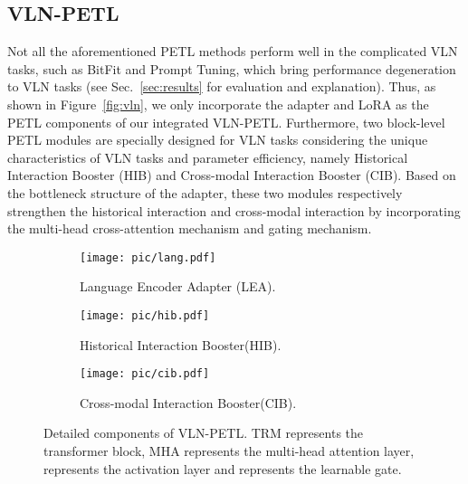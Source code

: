 \documentclass[10pt,twocolumn,letterpaper]{article}
\begin{document}
\vspace{-5pt}
\subsection{VLN-PETL}
\vspace{-3pt}
Not all the aforementioned PETL methods perform well in the complicated VLN tasks, such as BitFit and Prompt Tuning, which bring performance degeneration to VLN tasks (see Sec.~\ref{sec:results} for evaluation and explanation).  Thus, as shown in Figure~\ref{fig:vln}, we only incorporate the adapter and LoRA as the PETL components of our integrated VLN-PETL. 
Furthermore, two block-level PETL modules are specially designed for VLN tasks considering the unique characteristics of VLN tasks and parameter efficiency, namely Historical Interaction Booster (HIB) and Cross-modal Interaction Booster (CIB). Based on the bottleneck structure of the adapter, these two modules respectively strengthen the historical interaction and cross-modal interaction by incorporating the multi-head cross-attention mechanism and gating mechanism. 



\begin{figure*}[!ht]
  \centering
  \begin{subfigure}{0.33\linewidth}
    \centering
\parbox[][5.5cm][c]{\linewidth}{
    \texttt{[image: pic/lang.pdf]}
    }
    \vspace{-2pt}
    \caption{Language Encoder Adapter (LEA).}
    \label{fig:lang}
  \end{subfigure}
  \hfill
  \begin{subfigure}{0.33\linewidth}
    \centering
\parbox[][5.5cm][c]{\linewidth}{
    \texttt{[image: pic/hib.pdf]}
    }
    \vspace{-2pt}
    \caption{Historical Interaction Booster(HIB).}
    \label{fig:hib}
  \end{subfigure}
  \hfill
  \begin{subfigure}{0.33\linewidth}
    \centering
\parbox[][5.5cm][c]{\linewidth}{
    \texttt{[image: pic/cib.pdf]}
    }
    \vspace{-2pt}
    \caption{Cross-modal Interaction Booster(CIB).}
    \label{fig:cib}
  \end{subfigure}
  \vspace{-15pt}
  \caption{Detailed components of VLN-PETL. TRM represents the transformer block, MHA represents the multi-head attention layer,  represents the activation layer and  represents the learnable gate.}
  \label{fig:petl}
  \vspace{-15pt}
\end{figure*}
\end{document}

